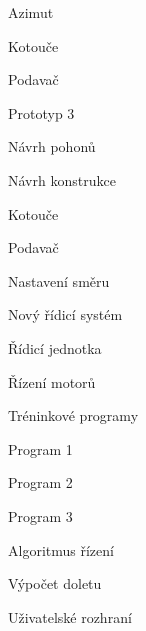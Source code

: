 \secc Azimut

\secc Kotouče

\secc Podavač


\chap Prototyp 3

\sec Návrh pohonů

\sec Návrh konstrukce

\secc Kotouče

\secc Podavač

\secc Nastavení směru










\chap Nový řídicí systém

\sec Řídicí jednotka

\sec Řízení motorů






\chap Tréninkové programy

\sec Program 1

\sec Program 2

\sec Program 3





\chap Algoritmus řízení

\sec Výpočet doletu





\chap Uživatelské rozhraní




